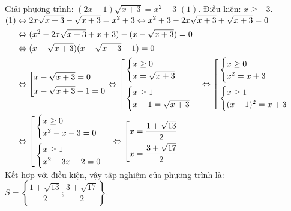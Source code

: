 \begin{ex}%
   Giải phương trình: $(2x-1)\sqrt{x+3}= x^2+3$ $(1)$.
\loigiai
    {
    Điều kiện: $x\geq -3$.\\
    $
    \begin{aligned}
    (1) &\Leftrightarrow  2x\sqrt{x+3}- \sqrt{x+3}= x^2+3 \Leftrightarrow  x^2+3 - 2x\sqrt{x+3}+ \sqrt{x+3}=0\\ 
    &\Leftrightarrow (x^2- 2x\sqrt{x+3}+ x+3)- (x- \sqrt{x+3})=0\\
    &\Leftrightarrow (x- \sqrt{x+3})(x- \sqrt{x+3}-1)=0\\
    &\Leftrightarrow \left[\begin{aligned}&x-\sqrt{x+3}=0\\& x-\sqrt{x+3}-1=0 \end{aligned}\right. \Leftrightarrow \left[\begin{aligned}&\begin{cases}x\geq 0\\ x= \sqrt{x+3} \end{cases}\\ &\begin{cases}x\geq 1\\ x-1= \sqrt{x+3} \end{cases} \end{aligned}\right.  \Leftrightarrow \left[\begin{aligned}& \begin{cases}x\geq 0\\ x^2=x+3 \end{cases} \\ & \begin{cases}x\geq 1\\ (x-1)^2= x+3 \end{cases} \end{aligned}\right.\\
    &\Leftrightarrow \left[\begin{aligned}&\begin{cases} x\geq 0\\ x^2-x-3=0 \end{cases} \\ &\begin{cases} x\geq 1\\ x^2-3x-2=0  \end{cases}\end{aligned}\right. \Leftrightarrow \left[\begin{aligned}&x=\dfrac{1+\sqrt{13}}{2}\\  &x= \dfrac{3+\sqrt{17}}{2} \end{aligned}\right.
\end{aligned}\\
$
Kết hợp với điều kiện, vậy tập nghiệm của phương trình là: $S= \left\{\dfrac{1+\sqrt{13}}{2}; \dfrac{3+\sqrt{17}}{2} \right\}$.
    }
\end{ex}

